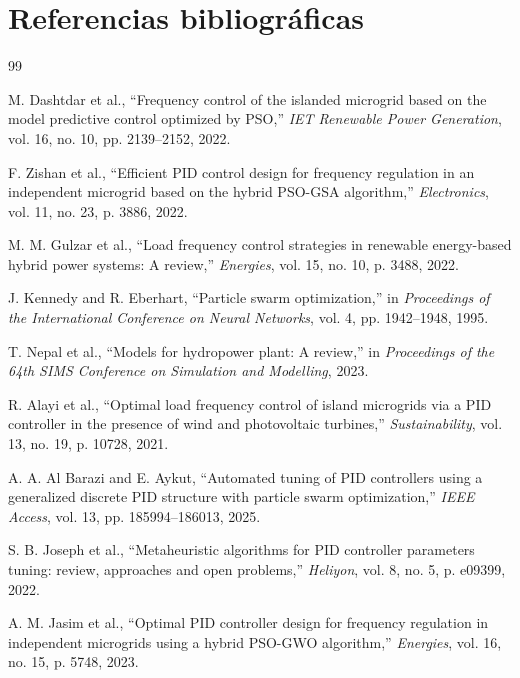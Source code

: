 \chapter*{Referencias bibliográficas}

\begin{thebibliography}{99}

M. Dashtdar et al., ``Frequency control of the islanded microgrid based on the model predictive control optimized by PSO,'' \textit{IET Renewable Power Generation}, vol. 16, no. 10, pp. 2139--2152, 2022.

F. Zishan et al., ``Efficient PID control design for frequency regulation in an independent microgrid based on the hybrid PSO-GSA algorithm,'' \textit{Electronics}, vol. 11, no. 23, p. 3886, 2022.

M. M. Gulzar et al., ``Load frequency control strategies in renewable energy-based hybrid power systems: A review,'' \textit{Energies}, vol. 15, no. 10, p. 3488, 2022.

J. Kennedy and R. Eberhart, ``Particle swarm optimization,'' in \textit{Proceedings of the International Conference on Neural Networks}, vol. 4, pp. 1942--1948, 1995.

T. Nepal et al., ``Models for hydropower plant: A review,'' in \textit{Proceedings of the 64th SIMS Conference on Simulation and Modelling}, 2023.

R. Alayi et al., ``Optimal load frequency control of island microgrids via a PID controller in the presence of wind and photovoltaic turbines,'' \textit{Sustainability}, vol. 13, no. 19, p. 10728, 2021.

A. A. Al Barazi and E. Aykut, ``Automated tuning of PID controllers using a generalized discrete PID structure with particle swarm optimization,'' \textit{IEEE Access}, vol. 13, pp. 185994--186013, 2025.

S. B. Joseph et al., ``Metaheuristic algorithms for PID controller parameters tuning: review, approaches and open problems,'' \textit{Heliyon}, vol. 8, no. 5, p. e09399, 2022.

A. M. Jasim et al., ``Optimal PID controller design for frequency regulation in independent microgrids using a hybrid PSO-GWO algorithm,'' \textit{Energies}, vol. 16, no. 15, p. 5748, 2023.


\end{thebibliography}
